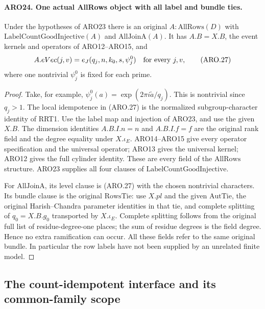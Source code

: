 \paragraph{ARO24. One actual AllRows object with all label and bundle ties.}
\label{claim:ARO24}
Under the hypotheses of ARO23 there is an original
\(A:\mathrm{AllRows}(D)\) with
\(\mathrm{LabelCountGoodInjective}(A)\) and
\(\mathrm{AllJoinA}(A)\).  It has \(A.B=X.B\), the event kernels
and operators of ARO12--ARO15, and
\[
                 A.eVec(j,v)=e_J(q_j,n,k_0,s,\psi_j^0)
                    \quad\hbox{for every }j,v,        \tag{ARO.27}
\]
where one nontrivial \(\psi_j^0\) is fixed for each prime.
\begin{proof}
Take, for example, \(\psi_j^0(a)=\exp(2\pi i\widetilde a/q_j)\).
This is nontrivial since \(q_j>1\).  The local idempotence in
(ARO.27) is the normalized subgroup-character identity of RRT1.
Use the label map and injection of ARO23, and use the given
\(X.B\).  The dimension identities \(A.B.I.n=n\) and
\(A.B.I.f=f\) are the original rank field and the degree equality
under \(X.\iota_E\).  ARO14--ARO15 give every operator specification
and the universal operator; ARO13 gives the universal kernel;
ARO12 gives the full cylinder identity.  These are every field
of the \(\mathrm{AllRows}\) structure.  ARO23 supplies all four
clauses of \(\mathrm{LabelCountGoodInjective}\).

For \(\mathrm{AllJoinA}\), its level clause is (ARO.27) with the
chosen nontrivial characters.  Its bundle clause is the original
\(\mathrm{RowsTie}\): use \(X.pl\) and the given \(\mathrm{AutTie}\),
the original Harish--Chandra parameter identities in that tie, and
complete splitting of \(q_0=X.B.g_0\) transported by
\(X.\iota_E\).  Complete splitting follows from the original
full list of residue-degree-one places; the sum of residue degrees
is the field degree.  Hence no extra ramification can occur.
All these fields refer to the same original bundle.  In particular
the row labels have not been supplied by an unrelated finite model.
\end{proof}

\subsection{The count-idempotent interface and its common-family scope}

